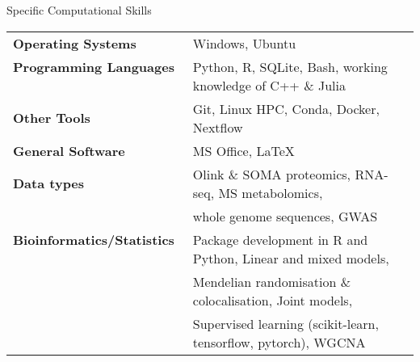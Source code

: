 \documentclass{resume}
\begin{document}
\begin{rSection}{Specific Computational Skills}

\begin{tabular}{ @{} >{\bfseries}l @{\hspace{3ex}} l }
Operating Systems \ & Windows, Ubuntu \vspace{2pt plus 1pt minus 1pt} \\
Programming Languages \ & Python, R, SQLite, Bash, working knowledge of C++ \& Julia \vspace{2pt plus 1pt minus 1pt} \\
Other Tools \ & Git, Linux HPC, Conda, Docker, Nextflow \vspace{2pt plus 1pt minus 1pt}\\
General Software \ & MS Office, \LaTeX  \vspace{2pt plus 1pt minus 1pt} \\
Data types \ & Olink \& SOMA proteomics, RNA-seq, MS metabolomics, \\
    \ & whole genome sequences, GWAS \vspace{2pt plus 1pt minus 1pt} \\ 
Bioinformatics/Statistics \ & Package development in R and Python, Linear and mixed models, \\
    \ & Mendelian randomisation \& colocalisation, Joint models, \\
    \ & Supervised learning (scikit-learn, tensorflow, pytorch), WGCNA \\
\end{tabular}


\end{rSection}
\end{document}
